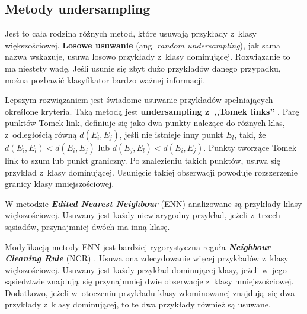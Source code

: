 \subsection{Metody undersampling}
Jest to cała rodzina różnych metod, które usuwają przykłady z~klasy większościowej. \textbf{Losowe usuwanie} (ang. \textit{random undersampling}), jak sama nazwa wskazuje, usuwa losowo przykłady z~klasy dominującej. Rozwiązanie to ma niestety wadę. Jeśli usunie się zbyt dużo przykładów danego przypadku, można pozbawić klasyfikator bardzo ważnej informacji. \par
Lepszym rozwiązaniem jest świadome usuwanie przykładów spełniających określone kryteria. Taką metodą jest \textbf{undersampling z~,,Tomek links''} \cite{tomelinksc}. Parę punktów Tomek link, definiuje się jako dwa punkty należące do różnych klas, z~odległością równą $d(E_i,E_j)$, jeśli nie istnieje inny punkt $E_l$, taki, że $d(E_i,E_l) < d(E_i,E_j)$ lub $d(E_j,E_l) < d(E_i,E_j)$. Punkty tworzące Tomek link to szum lub punkt graniczny. Po znalezieniu takich punktów, usuwa się przykład z~klasy dominującej. Usunięcie takiej obserwacji powoduje rozszerzenie granicy klasy mniejszościowej. \par
W metodzie \textbf{\textit{Edited Nearest Neighbour}} (ENN) \cite{enn} analizowane są przykłady klasy większościowej. Usuwany jest każdy niewiarygodny przykład, jeżeli z~trzech sąsiadów, przynajmniej dwóch ma inną klasę. \par
Modyfikacją metody ENN jest bardziej rygorystyczna reguła \textbf{\textit{Neighbour Cleaning Rule}} (NCR) \cite{ncr}. Usuwa ona zdecydowanie więcej przykładów z~klasy większościowej. Usuwany jest każdy przykład dominującej klasy, jeżeli w~jego sąsiedztwie znajdują się przynajmniej dwie obserwacje z~klasy mniejszościowej. Dodatkowo, jeżeli w~otoczeniu przykładu klasy zdominowanej znajdują się dwa przykłady z~klasy dominującej, to te dwa przykłady również są usuwane.

